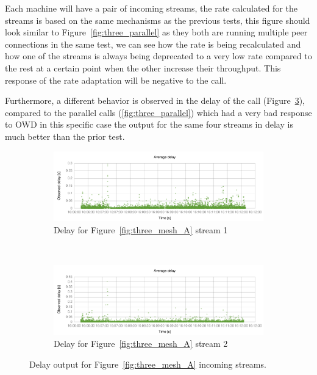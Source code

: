 Each machine will have a pair of incoming streams, the rate calculated for the streams is based on the same mechanisms as the previous tests, this figure should look similar to Figure~\ref{fig:three_parallel} as they both are running multiple peer connections in the same test, we can see how the rate is being recalculated and how one of the streams is always being deprecated to a very low rate compared to the rest at a certain point when the other increase their throughput. This response of the rate adaptation will be negative to the call. 

Furthermore, a different behavior is observed in the delay of the call (Figure~\ref{fig:delay_mesh_peer1}), compared to the parallel calls (\ref{fig:three_parallel}) which had a very bad response to OWD in this specific case the output for the same four streams in delay is much better than the prior test.

\begin{figure}[h]
        \centering
        \begin{subfigure}[b]{0.5\textwidth}
                \centering
                \includegraphics[width=\textwidth]{./figures/mesh_delay_1_116_6d141817.pdf}
                \caption{Delay for Figure~\ref{fig:three_mesh_A} stream 1}
                \label{fig:delay_mesh_peer1_1}
        \end{subfigure}%
        ~ %
        \begin{subfigure}[b]{0.5\textwidth}
                \centering
                \includegraphics[width=\textwidth]{./figures/mesh_delay_1_116_c57d9b9b.pdf}
                \caption{Delay for Figure~\ref{fig:three_mesh_A} stream 2}
                \label{fig:delay_mesh_peer1_2}
        \end{subfigure}
        \caption[Delay output for Figure~\ref{fig:three_mesh_A} incoming streams]{Delay output for Figure~\ref{fig:three_mesh_A} incoming streams.}
        \label{fig:delay_mesh_peer1}
\end{figure}

